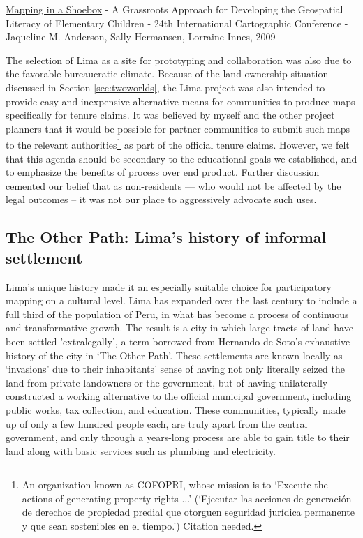 \documentclass[11pt,oneside,notitlepage]{report}
\begin{document}
\href{http://training.esri.com/campus/library/bibliography/RecordDetail.cfm?ID=95545&browseonly=0}{Mapping in a Shoebox} - A Grassroots Approach for Developing the Geospatial Literacy of Elementary Children - 24th International Cartographic Conference - Jaqueline M. Anderson, Sally Hermansen, Lorraine Innes, 2009

The selection of Lima as a site for prototyping and collaboration was also due to the favorable bureaucratic climate. Because of the land-ownership situation discussed in Section \ref{sec:twoworlds}, the Lima project was also intended to provide easy and inexpensive alternative means for communities to produce maps specifically for tenure claims. It was believed by myself and the other project planners that it would be possible for partner communities to submit such maps to the relevant authorities\footnote{An organization known as \ac{COFOPRI}, whose mission is to `Execute the actions of generating property rights ...' (`Ejecutar las acciones de generación de derechos de propiedad predial que otorguen seguridad jurídica permanente y que sean sostenibles en el tiempo.') Citation needed.} as part of the official tenure claims. However, we felt that this agenda should be secondary to the educational goals we established, and to emphasize the benefits of process over end product. Further discussion cemented our belief that as non-residents --- who would not be affected by the legal outcomes -- it was not our place to aggressively advocate such uses. 

\subsection{The Other Path: Lima's history of informal settlement}

Lima's unique history made it an especially suitable choice for participatory mapping on a cultural level. Lima has expanded over the last century to include a full third of the population of Peru, in what has become a process of continuous and transformative growth. The result is a city in which large tracts of land have been settled 'extralegally', a term borrowed from Hernando de Soto's exhaustive history of the city in `The Other Path'. These settlements are known locally as `invasions' due to their inhabitants' sense of having not only literally seized the land from private landowners or the government, but of having unilaterally constructed a working alternative to the official municipal government, including public works, tax collection, and education. These communities, typically made up of only a few hundred people each, are truly apart from the central government, and only through a years-long process are able to gain title to their land along with basic services such as plumbing and electricity.
\end{document}

